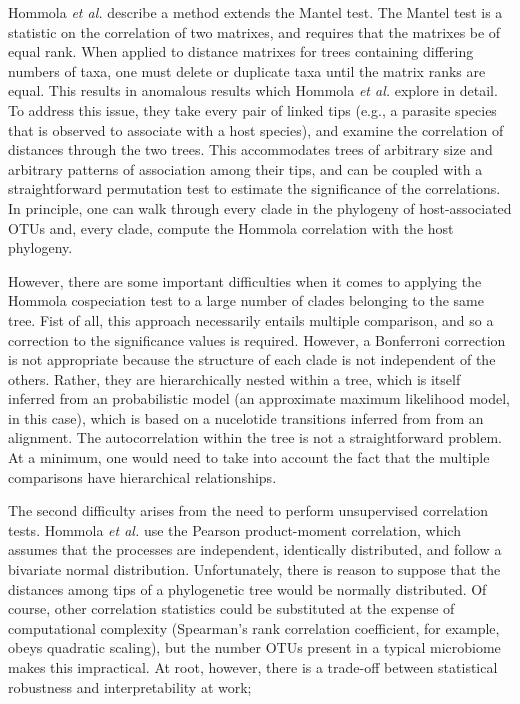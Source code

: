 Hommola {\em et al.} \cite{hommola2009permutation} describe a method extends the Mantel test. \cite{mantel1967detection} The Mantel test is a statistic on the correlation of two matrixes, and requires that the matrixes be of equal rank. When applied to distance matrixes for trees containing differing numbers of taxa, one must delete or duplicate taxa until the matrix ranks are equal. This results in anomalous results which Hommola {\em et al.} explore in detail. To address this issue, they take every pair of linked tips (e.g., a parasite species that is observed to associate with a host species), and examine the correlation of distances through the two trees. This accommodates trees of arbitrary size and arbitrary patterns of association among their tips, and can be coupled with a straightforward permutation test to estimate the significance of the correlations. In principle, one can walk through every clade in the phylogeny of host-associated OTUs and, every clade, compute the Hommola correlation with the host phylogeny. 



However, there are some important difficulties when it comes to applying the Hommola cospeciation test to a large number of clades belonging to the same tree. Fist of all, this approach necessarily entails multiple comparison, and so a correction to the significance values is required. However, a Bonferroni correction is not appropriate because the structure of each clade is not independent of the others. Rather, they are hierarchically nested within a tree, which is itself inferred from an probabilistic model (an approximate maximum likelihood model, in this case), which is based on a nucelotide transitions inferred from from an alignment. The autocorrelation within the tree is not a straightforward problem. At a minimum, one would need to take into account the fact that the multiple comparisons have hierarchical relationships.

The second difficulty arises from the need to perform unsupervised correlation tests. Hommola {\em et al.} use the Pearson product-moment correlation, which assumes that the processes are independent, identically distributed, and follow a bivariate normal distribution. Unfortunately, there is reason to suppose that the distances among tips of a phylogenetic tree would be normally distributed. Of course, other correlation statistics could be substituted at the expense of computational complexity (Spearman's rank correlation coefficient, for example, obeys quadratic scaling), but the number OTUs present in a typical microbiome makes this impractical. At root, however, there is a trade-off between statistical robustness and interpretability at work; 

